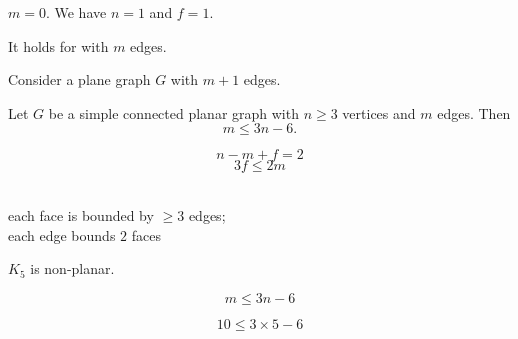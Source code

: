 \begin{frame}{}
  \begin{center}

    \pause
    \vspace{0.30cm}
    \begin{description}
      \setlength{\itemsep}{8pt}
      \item[Basis Step:] $m = 0$. We have $n = 1$ and $f = 1$.
      \item[Induction Hypothesis:]
        It holds for  with $m$ edges.
      \item[Induction Step:] Consider a plane graph $G$ with $m+1$ edges. \\[5pt]
    \end{description}
  \end{center}
\end{frame}

\begin{frame}{}
  \begin{theorem}
    Let $G$ be a simple connected planar graph with $n \ge 3$ vertices
    and $m$ edges. Then
    \[
      m \le 3n -6.
    \]
  \end{theorem}

  \pause
  \[
    n - m + f = 2
  \]
  \pause
  \[
    3f \le 2m
  \]
  \pause
  \begin{center}
     \\[3pt]
    each face is bounded by $\ge 3$ edges; \\
    each edge bounds $2$ faces
  \end{center}
\end{frame}

\begin{frame}{}
  \begin{theorem}
    $K_{5}$ is non-planar.
  \end{theorem}

  \pause
  \[
    m \le 3n -6
  \]

  \pause
  \[
    10 \le 3 \times 5 - 6
  \]
\end{frame}

